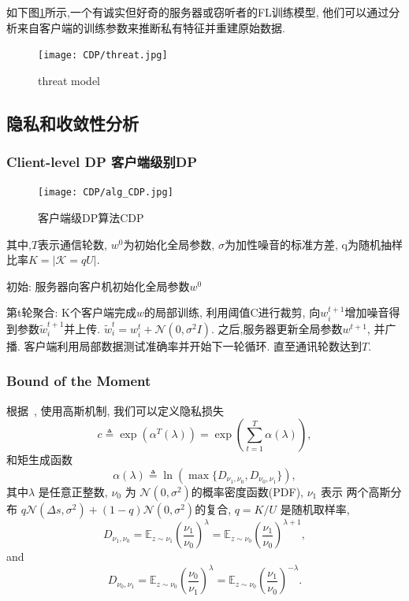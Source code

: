 如下图\ref{fig:threatModel}所示,一个有诚实但好奇的服务器或窃听者的FL训练模型, 他们可以通过分析来自客户端的训练参数来推断私有特征并重建原始数据. 

\begin{figure}[!ht]
    \centering
    \texttt{[image: CDP/threat.jpg]}
    \caption{threat model}
    \label{fig:threatModel}
\end{figure}

\subsection{隐私和收敛性分析}


\subsubsection{Client-level DP 客户端级别DP}

\begin{figure}[!ht]
    \centering
    \texttt{[image: CDP/alg\_CDP.jpg]}
    \caption{客户端级DP算法CDP}
    \label{fig:alg_CDP}
\end{figure}
其中,$T$表示通信轮数, $w^0$为初始化全局参数, $\sigma$为加性噪音的标准方差, q为随机抽样比率$K=| \mathcal{K}= qU|$. 

初始: 服务器向客户机初始化全局参数$w^0$

第t轮聚合: K个客户端完成$w$的局部训练, 利用阈值C进行裁剪, 向$w_i^{t+1}$增加噪音得到参数$\tilde{w}_i^{t+1}$并上传. $\tilde{w}_i^t=w_i^t + \mathcal{N}(0, \sigma^2I)$. 
之后,服务器更新全局参数$w^{t+1}$, 并广播. 客户端利用局部数据测试准确率并开始下一轮循环.
直至通讯轮数达到$T$.

\subsubsection{Bound of the Moment}
根据~\cite{abadi2016DLwithDP}, 使用高斯机制, 我们可以定义隐私损失
\begin{equation}
c \triangleq \exp\left(\alpha^{T}(\lambda)\right) = \exp\left(\sum_{t=1}^{T}\alpha(\lambda)\right),
\end{equation}
和矩生成函数
\begin{equation}
\alpha(\lambda) \triangleq \ln(\max \{D_{\nu_{1},\nu_{0}}, D_{\nu_{0},\nu_{1}}\}),
\end{equation}
其中$\lambda$ 是任意正整数, $\nu_{0}$ 为 $\mathcal{N}(0,\sigma^{2})$的概率密度函数(PDF), $\nu_{1}$ 表示 两个高斯分布 $q\mathcal{N}(\Delta s,\sigma^{2})+(1-q)\mathcal{N}(0,\sigma^{2})$的复合, $q=K/U$ 是随机取样率,
\begin{equation}
D_{\nu_{1},\nu_{0}}=\mathbb{E}_{z\sim \nu_{1}}\left(\frac{\nu_{1}}{\nu_{0}}\right)^{\lambda}=\mathbb{E}_{z\sim \nu_{0}}\left(\frac{\nu_{1}}{\nu_{0}}\right)^{\lambda+1},
\end{equation}
and
\begin{equation}
D_{\nu_{0},\nu_{1}}=\mathbb{E}_{z\sim \nu_{0}}\left(\frac{\nu_{0}}{\nu_{1}}\right)^{\lambda}=\mathbb{E}_{z\sim \nu_{0}}\left(\frac{\nu_{1}}{\nu_{0}}\right)^{-\lambda}.
\end{equation}

